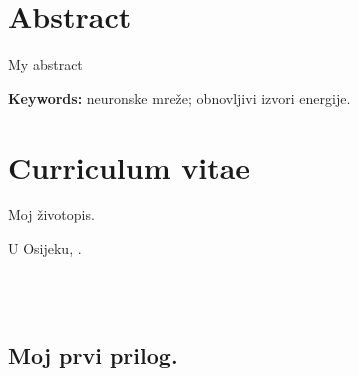\documentclass[phd, a4paper,oneside, 12pt]{report}
\begin{document}
	\chapter*{Abstract}
    \vspace{-1.6cm}
    \textbf{\entitle}
    \vspace{0.5cm}
    
	\noindent My abstract
	
	\vspace{0.5cm}
	\textbf{Keywords:} neuronske mreže; obnovljivi izvori energije.
	
	\chapter*{Curriculum vitae}
	Moj životopis.
	\vspace{4.5cm}
	
	U Osijeku, \the\year{}. \hspace{60mm} \noindent \hrulefill 
	
	\hspace{76mm}\phantom{Student: }\authorname \\ \\
	
	\clearpage
	\begin{appendices}
		\chapter{Moj prvi prilog.}\label{app:app01}
		
	\end{appendices}
	
	
	

	
\end{document}
